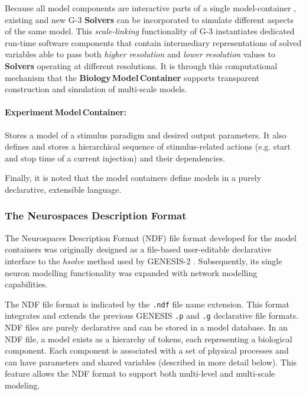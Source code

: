\documentclass[11pt,3p,twocolumn]{JMN}
\begin{document}
Because all model components are interactive parts of a single model-container \cite{cornelis12}, existing and new G-3 {\bf Solvers} can be incorporated to simulate different aspects of the same model.  This {\em scale-linking} functionality of G-3 instantiates dedicated run-time software components that contain intermediary representations of solved variables able to pass both {\em higher resolution} and {\em lower resolution} values to {\bf Solvers} operating at different resolutions.
It is through this computational mechanism that the {\bf Biology\,Model\,Container} supports transparent construction and simulation of multi-scale models.

\paragraph{Experiment\,Model\,Container:} Stores a model of a stimulus paradigm and desired output parameters. It also defines and stores a hierarchical sequence of stimulus-related
actions (e.g. start and stop time of a current injection) and their dependencies.

Finally, it is noted that the model containers define models in a purely declarative,
extensible language.

\subsubsection{The Neurospaces Description Format}

The Neurospaces Description Format (NDF) file format developed for the model containers was originally designed as a file-based user-editable declarative interface to the {\it hsolve} method used by GENESIS-2 \cite{cornelis03:_inter_model_space_simul_space,beeman12:_years_comput_neuros}. Subsequently, its single neuron modelling functionality was expanded with network modelling capabilities.

The NDF file format is indicated by the {\tt .ndf} file name extension. This format integrates and extends the previous GENESIS {\tt .p} and {\tt .g} declarative file formats. NDF files are purely declarative and can be stored in a model database. In an NDF file, a
model exists as a hierarchy of tokens, each representing a biological component.  Each component is associated with a set of physical processes and can have parameters and shared variables (described in more detail below).  This feature allows the NDF format to support
both multi-level and multi-scale modeling.
\end{document}
